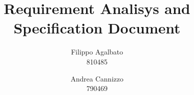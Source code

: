 \documentclass[a4paper]{report}
\begin{document}
\setcounter{tocdepth}{1}

\title{\Huge Requirement Analisys and Specification Document}
\author{Filippo Agalbato \\ 810485 \and Andrea Cannizzo \\ 790469}
\maketitle

\tableofcontents





\end{document}
